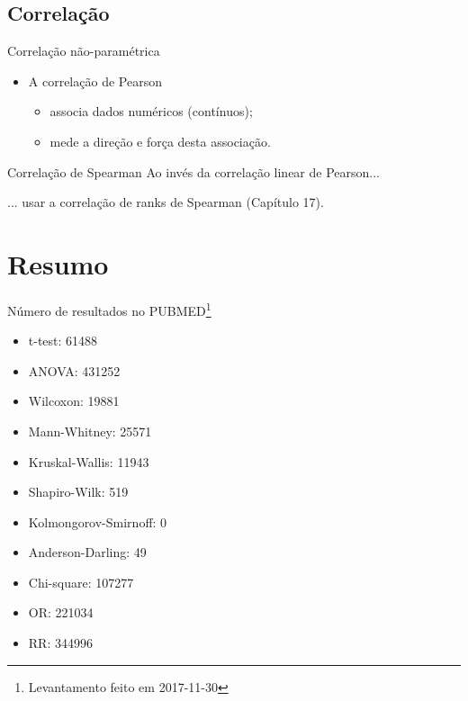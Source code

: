 \documentclass{beamer}
\begin{document}
\subsection{Correlação}

\begin{frame}{Correlação não-paramétrica}
  \begin{itemize}
    \small
  \item A correlação de Pearson
    \begin{itemize}
      \scriptsize
    \item associa dados numéricos (contínuos);
    \item mede a direção e força desta associação.
    \end{itemize}
  \end{itemize}
  \bigskip
  \begin{block}{Correlação de Spearman}
    \small
    Ao invés da correlação linear de Pearson...

    \bigskip
    ... usar a correlação de ranks de Spearman (Capítulo 17).
  \end{block}
\end{frame}

\section{Resumo}

\begin{frame}{Número de resultados no PUBMED\footnote{\scriptsize Levantamento feito em 2017-11-30}}
  \begin{itemize}
    \footnotesize
  \item t-test: 61488
  \item ANOVA: 431252
  \item Wilcoxon: 19881
  \item Mann-Whitney: 25571
  \item Kruskal-Wallis: 11943
  \item Shapiro-Wilk: 519
  \item Kolmongorov-Smirnoff: 0
  \item Anderson-Darling: 49
  \item Chi-square: 107277
  \item OR: 221034
  \item RR: 344996
  \end{itemize}
\end{frame}
\end{document}
